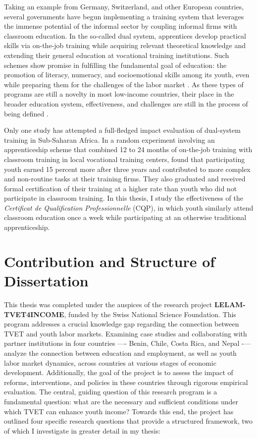 \documentclass[
  a4paper, twoside, 12pt]{book}
\begin{document}
Taking an example from Germany, Switzerland, and other European countries, several governments have begun implementing a training system that leverages the immense potential of the informal sector by coupling informal firms with classroom education. In the so-called dual system, apprentices develop practical skills via on-the-job training while acquiring relevant theoretical knowledge and extending their general education at vocational training institutions. Such schemes show promise in fulfilling the fundamental goal of education: the promotion of literacy, numeracy, and socioemotional skills among its youth, even while preparing them for the challenges of the labor market \autocite{arias2019}. As these types of programs are still a novelty in most low-income countries, their place in the broader education system, effectiveness, and challenges are still in the process of being defined \autocite{igarashi2018}.

Only one study has attempted a full-fledged impact evaluation of dual-system training in Sub-Saharan Africa. In a random experiment involving an apprenticeship scheme that combined 12 to 24 months of on-the-job training with classroom training in local vocational training centers, \textcite{crepon2019} found that participating youth earned 15 percent more after three years and contributed to more complex and non-routine tasks at their training firms. They also graduated and received formal certification of their training at a higher rate than youth who did not participate in classroom training. In this thesis, I study the effectiveness of the \emph{Certificat de Qualification Professionnelle} (CQP), in which youth similarly attend classroom education once a week while participating at an otherwise traditional apprenticeship.

\hypertarget{contribution-and-structure-of-dissertation}{%
\section{Contribution and Structure of Dissertation}\label{contribution-and-structure-of-dissertation}}

This thesis was completed under the auspices of the research project \textbf{LELAM-TVET4INCOME}, funded by the Swiss National Science Foundation. This program addresses a crucial knowledge gap regarding the connection between TVET and youth labor markets. Examining case studies and collaborating with partner institutions in four countries ---- Benin, Chile, Costa Rica, and Nepal -\/--- analyze the connection between education and employment, as well as youth labor market dynamics, across countries at various stages of economic development. Additionally, the goal of the project is to assess the impact of reforms, interventions, and policies in these countries through rigorous empirical evaluation. The central, guiding question of this research program is a fundamental question: what are the necessary and sufficient conditions under which TVET can enhance youth income? Towards this end, the project has outlined four specific research questions that provide a structured framework, two of which I investigate in greater detail in my thesis:
\end{document}
